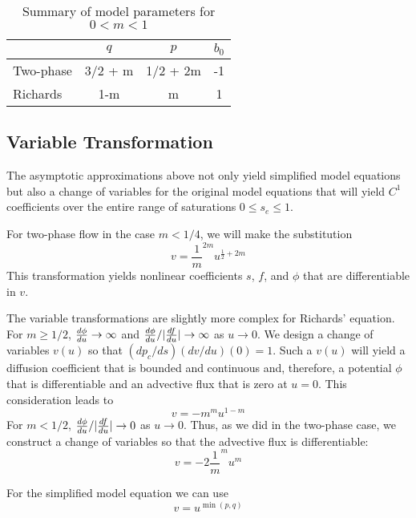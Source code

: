 \documentclass[10pt,dvips,twoside,reqno]{amsart}
\begin{document}
\begin{table}
\caption{Summary of model parameters for $0<m<1$ \label{tab:pqrParms}}
\begin{tabular}{lccc}
&$q$ & $p$ & $b_0$ \\
\hline
Two-phase & 3/2 + m & 1/2 + 2m & -1 \\
Richards & 1-m & m & 1 \\ 
\hline
\end{tabular}
\end{table}

\subsection{Variable Transformation}

The asymptotic approximations above not only yield simplified model
equations but also a change of variables for the original
model equations that will yield $C^1$
coefficients over the entire range of saturations $0\leq s_e \leq 1$. 

For two-phase flow in the case $m<1/4$, we will make the substitution
\begin{equation}
  \label{eq:cov}
  v = \frac{1}{m}^{2m} u^{\frac{1}{2}+2m}
\end{equation}
This transformation yields nonlinear coefficients $s$, $f$, and $\phi$
that are differentiable in $v$.

The variable transformations are slightly more complex for Richards'
equation. For $m\geq1/2$, $\frac{d {\phi}}{d {u}} \rightarrow \infty$ and $\frac{d {\phi}}{d {u}}/|\frac{d {f}}{d {u}}|
\rightarrow \infty$ as $u \rightarrow 0$.  We design a change of
variables $v(u)$ so that $(dp_c/ds)(d v/du)(0) = 1$. Such a $v(u)$
will yield a diffusion coefficient that is bounded and continuous
and, therefore, a potential $\phi$ that is differentiable and an
advective flux that is zero at $u=0$.  This consideration leads to
\begin{equation}
  \label{eq:cofRE1}
  v = -m^m u^{1-m}
\end{equation}
For $m<1/2$, $\frac{d {\phi}}{d {u}}/|\frac{d {f}}{d {u}}| \rightarrow 0$ as $u \rightarrow 0$. Thus,
as we did in the two-phase case, we construct a change of variables so
that the advective flux is differentiable:
\begin{equation}
  \label{eq:covRE2}
  v = -2 \frac{1}{m}^m u^m
\end{equation}

For the simplified model equation we can use 
\begin{equation}
  \label{eq:pqr}
  v = u^{\min(p,q)}
\end{equation}
\end{document}
